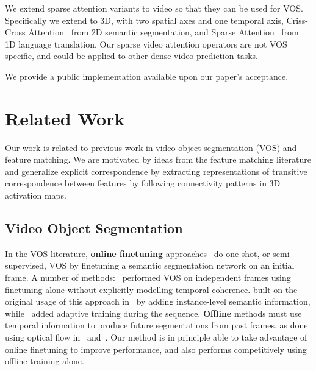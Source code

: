 We extend sparse attention variants to video so that they can be used for VOS.
Specifically we extend to 3D, with two spatial axes and one temporal axis,
Criss-Cross Attention~\cite{huang2018ccnet} from 2D semantic segmentation, and
Sparse Attention~\cite{child2019sparsetransformer} from 1D language
translation.
Our sparse video attention operators are not VOS specific, and could be applied
to other dense video prediction tasks.




We provide a public implementation available upon our paper's acceptance.


\section{Related Work}

Our work is related to previous work in video object segmentation (VOS) and
feature matching.
We are motivated by ideas from the feature matching literature and
generalize explicit correspondence by extracting representations of transitive
correspondence between features by following connectivity patterns in 3D
activation maps.


\subsection{Video Object Segmentation}

In the VOS literature, \textbf{online finetuning}
approaches~\cite{bao2018cnn,caelles2017one,maninis2018video,voigtlaender2017online,hu2018motion,khoreva2017learning,li2018video}
do one-shot, or semi-supervised, VOS by finetuning a semantic segmentation
network on an initial frame.
A number of methods:~\cite{cheng2018fast,caelles2017one,maninis2018video,voigtlaender2017online}
performed VOS on independent frames using finetuning alone without explicitly
modelling temporal coherence.
\cite{maninis2018video} built on the original usage of this approach
in~\cite{caelles2017one} by adding instance-level semantic information,
while~\cite{voigtlaender2017online} added adaptive training during the
sequence.
\textbf{Offline} methods must use temporal information to produce future
segmentations from past frames, as done using optical flow
in~\cite{jang2017online} and~\cite{tsai2016video}.
Our method is in principle able to take advantage of online finetuning to
improve performance, and also performs competitively using offline training
alone.

